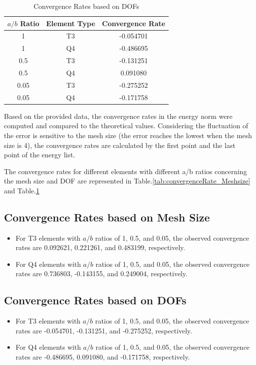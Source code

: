 \documentclass[twoside,twocolumn,10pt]{article}
\begin{document}
\begin{table}[h]
    \centering
    \caption{Convergence Rates based on DOFs}
    \begin{tabular}{|c|c|c|}
    \hline
    \(a/b\) Ratio & Element Type & Convergence Rate\\
    \hline
    1 & T3 & -0.054701 \\
    1 & Q4 & -0.486695 \\
    0.5 & T3 & -0.131251 \\
    0.5 & Q4 & 0.091080 \\
    0.05 & T3 & -0.275252 \\
    0.05 & Q4 & -0.171758 \\
    \hline
    \end{tabular}
  \label{tab:convergenceRate_DOF}
\end{table}

Based on the provided data, the convergence rates in the energy norm were computed and compared to the theoretical values. Considering the fluctuation of the error is sensitive to the mesh size (the error reaches the lowest when the mesh size is 4), the convergence rates are calculated by the first point and the last point of the energy list.

The convergence rates for different elements with different a/b ratios concerning the mesh size and DOF are represented in Table.\ref{tab:convergenceRate_Meshsize} and Table.\ref{tab:convergenceRate_DOF}

\subsection*{Convergence Rates based on Mesh Size}

\begin{itemize}
    \item For T3 elements with \(a/b\) ratios of 1, 0.5, and 0.05, the observed convergence rates are 0.092621, 0.221261, and 0.483199, respectively.
    \item For Q4 elements with \(a/b\) ratios of 1, 0.5, and 0.05, the observed convergence rates are 0.736803, -0.143155, and 0.249004, respectively.
\end{itemize}

\subsection*{Convergence Rates based on DOFs}

\begin{itemize}
    \item For T3 elements with \(a/b\) ratios of 1, 0.5, and 0.05, the observed convergence rates are -0.054701, -0.131251, and -0.275252, respectively. 
    \item For Q4 elements with \(a/b\) ratios of 1, 0.5, and 0.05, the observed convergence rates are -0.486695, 0.091080, and -0.171758, respectively. 
\end{itemize}
\end{document}
